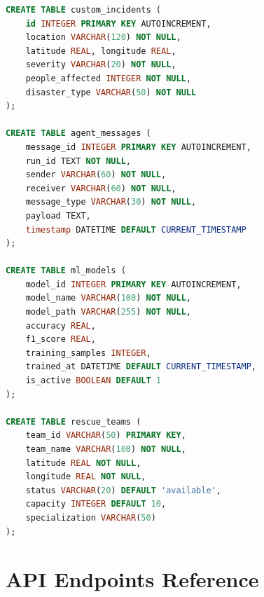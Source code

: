 \begin{lstlisting}[style=codestyle, language=SQL, caption=Complete SQLite schema (condensed)]
CREATE TABLE custom_incidents (
    id INTEGER PRIMARY KEY AUTOINCREMENT,
    location VARCHAR(120) NOT NULL,
    latitude REAL, longitude REAL,
    severity VARCHAR(20) NOT NULL,
    people_affected INTEGER NOT NULL,
    disaster_type VARCHAR(50) NOT NULL
);

CREATE TABLE agent_messages (
    message_id INTEGER PRIMARY KEY AUTOINCREMENT,
    run_id TEXT NOT NULL,
    sender VARCHAR(60) NOT NULL,
    receiver VARCHAR(60) NOT NULL,
    message_type VARCHAR(30) NOT NULL,
    payload TEXT,
    timestamp DATETIME DEFAULT CURRENT_TIMESTAMP
);

CREATE TABLE ml_models (
    model_id INTEGER PRIMARY KEY AUTOINCREMENT,
    model_name VARCHAR(100) NOT NULL,
    model_path VARCHAR(255) NOT NULL,
    accuracy REAL,
    f1_score REAL,
    training_samples INTEGER,
    trained_at DATETIME DEFAULT CURRENT_TIMESTAMP,
    is_active BOOLEAN DEFAULT 1
);

CREATE TABLE rescue_teams (
    team_id VARCHAR(50) PRIMARY KEY,
    team_name VARCHAR(100) NOT NULL,
    latitude REAL NOT NULL,
    longitude REAL NOT NULL,
    status VARCHAR(20) DEFAULT 'available',
    capacity INTEGER DEFAULT 10,
    specialization VARCHAR(50)
);
\end{lstlisting}

\section{API Endpoints Reference}
\label{sec:appendix_api}

